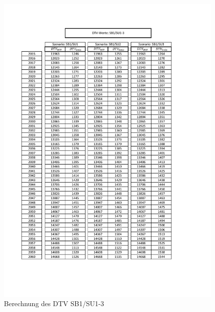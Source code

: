 \begin{figure}[h!]
	\centering
	\includegraphics[width=\textwidth]{figures/Anhang/f-00-10-01-DTV-Modellierung}
	\caption{Berechnung des DTV SB1/SU1-3}
	\label{img:DTVModellierung}
\end{figure}

